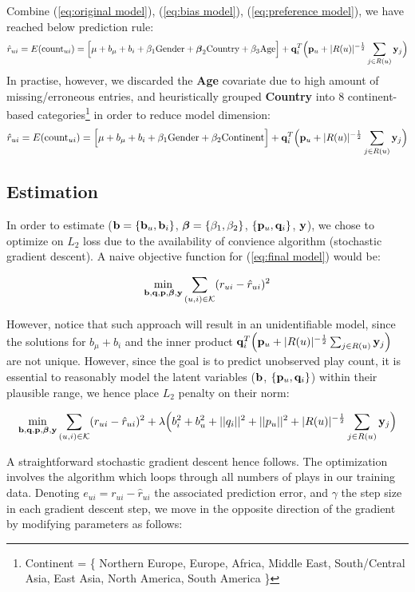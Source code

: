 \documentclass[11pt]{article}
\theoremstyle{definition}
\begin{document}
Combine (\ref{eq:original model}), (\ref{eq:bias model}), (\ref{eq:preference model}), we have reached below prediction rule:
\begin{align*}
\hat{r}_{ui} = E(\mbox{count}_{ui}) = 
\Big[ \mu + b_\mu + b_i + \beta_1\mbox{Gender} + \boldsymbol{\beta}_2\mbox{Country} +  \beta_3\mbox{Age}  \Big] + 
{\bf q}_i^T \Big({\bf p}_u+|R(u)|^{-\frac{1}{2}} \sum_{j \in R(u)}{\bf y}_j \Big)
\end{align*}
In practise, however, we discarded the \textbf{Age} covariate due to high amount of missing/erroneous entries, and heuristically grouped \textbf{Country} into 8 continent-based categories\footnote{Continent = \{ Northern  Europe, Europe, Africa, Middle East, South/Central Asia, East Asia, North America, South America \}} in order to reduce model dimension: 
\begin{align}
\hat{r}_{ui} = E(\mbox{count}_{ui}) = 
\Big[ \mu + b_\mu + b_i + \beta_1\mbox{Gender} + \beta_2\mbox{Continent} \Big] + 
{\bf q}_i^T \Big({\bf p}_u+|R(u)|^{-\frac{1}{2}} \sum_{j \in R(u)}{\bf y}_j \Big)
\label{eq:final model}
\end{align}


\subsection{\textbf{Estimation}}\label{sec:estimation}

 In order to estimate (${\bf b} = \{{\bf b}_u,{\bf b}_i\}$, $\boldsymbol{\beta} = \{\beta_1, \beta_2\}$, $\{{\bf p}_u, {\bf q}_i\}$, ${\bf y}$), we chose to optimize on $L_2$ loss due to the availability of convience algorithm (stochastic gradient descent). A naive objective function for (\ref{eq:final model}) would be:

$$\min_{{\bf b}, {\bf q},{\bf p}, \boldsymbol{\beta}, {\bf y}} 
\sum_{(u, i) \in {\cal K}} (r_{ui} - \hat{r}_{ui})^2$$

However, notice that such approach will result in an unidentifiable model, since the solutions for $ b_\mu + b_i $ and the inner product ${\bf q}_i^T \Big({\bf p}_u+|R(u)|^{-\frac{1}{2}} \sum_{j \in R(u)}{\bf y}_j \Big)$ are not unique. However, since the goal is to predict unobserved play count, it is essential to reasonably model the latent variables (${\bf b}$, $\{{\bf p}_u, {\bf q}_i\}$) within their plausible range, we hence place $L_2$ penalty on their norm:

$$\min_{{\bf b}, {\bf q},{\bf p}, \boldsymbol{\beta}, {\bf y}} \sum_{(u, i) \in {\cal K}} (r_{ui} - \hat{r}_{ui})^2 + \lambda \Big(b_i^2 + b_u^2 + ||q_i||^2 + ||p_u||^2 +|R(u)|^{-\frac{1}{2}} \sum_{j \in R(u)}{\bf y}_j \Big)$$

A straightforward stochastic gradient descent hence follows. The optimization involves the algorithm which loops through all numbers of plays in our training data. Denoting $e_{ui} = r_{ui} - \hat{r}_{ui}$ the associated prediction error, and $\gamma$ the step size in each gradient descent step, we move in the opposite direction of the gradient by modifying parameters as follows:
\end{document}
